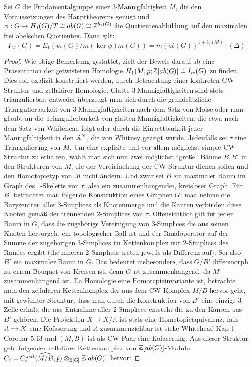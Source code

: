 \begin{thm}
\label{thm:keralexnorm}
	Sei $G$ die Fundamentalgruppe einer 3-Mannigfaltigkeit $M$, die den Voraussetzungen des Haupttheorems genügt und $\phi:G \to H_1(G)/T \cong ab(G) \cong \mathbb{Z}^{b_1(G)}$ die Quotientenabbildung auf den maximalen frei abelschen Quotienten. Dann gilt:
	\[
		I_M(G)=E_1(m(G)/m(\ker\phi)m(G)) = m(ab(G))^{1+b_3(M)}\cdot (\Delta) 
	\]
\end{thm}
\begin{proof}
	Wie obige Bemerkung gestattet, zielt der Beweis darauf ab eine Präsentation der getwisteten Homologie $H_1(M,p;\mathbb{Z}[ab(G)]\cong I_m(G)$ zu finden. Dies soll explizit konstruiert werden, durch Betrachtung einer konkreten CW-Struktur und zellulärer Homologie. Glatte 3-Mannigfaltigkeiten sind stets triangulierbar, entweder überzeugt man sich durch die grundsätzliche Triangulierbarkeit von 3-Mannigfaltigkeiten nach dem Satz von Moise oder man glaubt an die Triangulierbarkeit von glatten Mannigfaltigkeiten, die etwa nach dem Satz von Whitehead folgt oder durch die Einbettbarkeit jeder Mannigfaltigkeit in den $\mathbb{R}^N$, die von Whitney gezeigt wurde. Jedenfalls sei $\tau$ eine Triangulierung von $M$. Um eine explizite und vor allem möglichst simple CW-Struktur zu erhalten, wählt man sich nun zwei möglichst "`große"' Bäume $B,B'$ in den Strukturen von $M$, die der Vereinfachung der CW-Struktur dienen sollen und den Homotopietyp von $M$ nicht ändern. Und zwar sei $B$ ein maximaler Baum im Graph des 1-Skeletts von $\tau$, also ein zusammenhängender, kreisloser Graph. Für $B'$ betrachtet man folgende Konstruktion eines Graphen $G$:  man nehme die Baryzentren aller $3$-Simplices als Knotenmenge und die Kanten verbinden diese Knoten gemäß der trennenden $2$-Simplices von $\tau$. Offensichtlich gilt für jeden Baum in $G$, dass die zugehörige Vereinigung von $3$-Simplices die aus seinen Knoten hervorgeht ein topologischer Ball ist und der Randoperator auf der Summe der zugehörigen 3-Simplices im Kettenkomplex nur 2-Simplices des Randes ergibt (die inneren 2-Simplices treten jeweils als Differenz auf). Sei also $B'$ ein maximaler Baum in $G$. Das bedeutet insbesondere, dass $G/B'$ diffeomorph zu einem Bouquet von Kreisen ist, denn $G$ ist zusammenhängend, da $M$ zusammenhängend ist. Da Homologie eine Homotopieinvariante ist, betrachte man den zellulären Kettenkomplex der aus dem CW-Komplex $M/B$ hervor geht, mit gewählter Struktur, dass man durch die Konstruktion von $B'$ eine einzige 3-Zelle erhält, die aus Entnahme aller 2-Simplices entsteht die zu den Kanten aus $B'$ gehören. Die Projektion $X \to X/A$ ist stets eine Homotopieäquivalenz, falls $A\hookrightarrow X$ eine Kofaserung und $A$ zusammenziehbar ist siehe Whitehead Kap 1 Corollar 5.13 und $(M,B)$ ist als CW-Paar eine Kofaserung. Aus dieser Struktur geht folgender zellulärer Kettenkomplex von $\mathbb{Z}[ab(G)]$-Moduln $C_i=C_i^{zell}(\widehat{M/B},\hat p)\otimes_{\mathbb{Z}[G]}\mathbb{Z}[ab(G)]$ hervor:

\end{proof}

